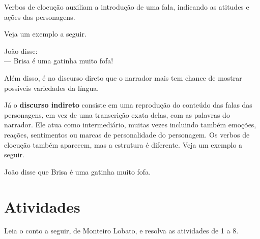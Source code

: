 {Verbos de elocução auxiliam a introdução de uma fala, 
indicando as atitudes e ações das personagens. 

Veja um exemplo a seguir.

\begin{myquote}
João disse:\\
--- Brisa é uma gatinha muito fofa!
\end{myquote}

Além disso, é no discurso direto que o narrador mais tem chance de mostrar
possíveis variedades da língua.

Já o \textbf{discurso indireto} consiste em uma reprodução do conteúdo das falas das
personagens, em vez de uma transcrição exata delas, com as palavras do
narrador. Ele atua como intermediário, muitas vezes incluindo também
emoções, reações, sentimentos ou marcas de personalidade do personagem.
Os verbos de elocução também aparecem, mas a estrutura é diferente.
Veja um exemplo a seguir.

\begin{myquote}
João disse que Brisa é uma gatinha muito fofa.
\end{myquote}
}

\section*{Atividades}

Leia o conto a seguir, de Monteiro Lobato, e resolva as atividades de 1 a 8.



